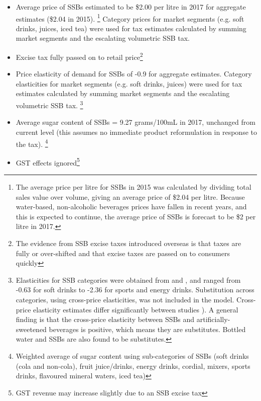 \documentclass[embargoed]{grattan}
\begin{document}
\begin{itemize}
\item
  Average price of SSBs estimated to be \$2.00 per litre in 2017 for aggregate estimates (\$2.04 in 2015). \footnote{The average price per litre for SSBs in 2015 was calculated by dividing total sales value over volume, giving an average price of \$2.04 per litre.
Because water-based, non-alcoholic beverages prices have fallen in recent years, and this is expected to continue, the average price of SSBs is forecast to be \$2 per litre in 2017.} Category prices for market segments (e.g. soft drinks, juices, iced tea) were used for tax estimates calculated by summing market segments and the escalating volumetric SSB tax.
\item
  Excise tax fully passed on to retail price\footnote{The evidence from SSB excise taxes introduced overseas is that taxes are fully or over-shifted and that excise taxes are passed on to consumers quickly}
\item
  Price elasticity of demand for SSBs of -0.9 for aggregate estimates.
Category elasticities for market segments (e.g. soft drinks, juices) were used for tax estimates calculated by summing market segments and the escalating volumetric SSB tax.%
\footnote{Elasticities for SSB categories were obtained from \textcite{Sharma2014effectstaxingsugarsweetened} and \textcite{Zhen2014Predictingeffectssugar}, and ranged from -0.63 for soft drinks to -2.36 for sports and energy drinks.
Substitution across categories, using cross-price elasticities, was not included in the model.
Cross-price elasticity estimates differ significantly between studies \textcite{Organization2016FiscalPoliciesDiet}).
A general finding is that the cross-price elasticity between SSBs and artificially-sweetened beverages is positive, which means they are substitutes.
Bottled water and SSBs are also found to be substitutes.}
\item
  Average sugar content of SSBs = 9.27 grams/100mL in 2017, unchanged from current level (this assumes no immediate product reformulation in response to the tax).%
\footnote{Weighted average of sugar content using sub-categories of SSBs (soft drinks (cola and non-cola), fruit juice/drinks, energy drinks, cordial, mixers, sports drinks, flavoured mineral waters, iced tea)\textcites{rethinksugarydrink2016Howmuchsugar}{HealthCth2014FactSheetHow}} 
\item
  GST effects ignored\footnote{GST revenue may increase slightly due to an SSB excise tax}
\end{itemize}
\end{document}

